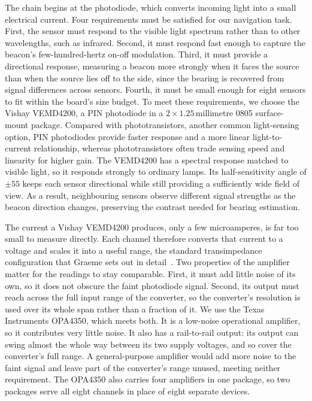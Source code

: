 The chain begins at the photodiode, which converts incoming light into a small electrical current. Four requirements must be satisfied for our navigation task. First, the sensor must respond to the visible light spectrum rather than to other wavelengths, such as infrared. Second, it must respond fast enough to capture the beacon's few-hundred-hertz on-off modulation. Third, it must provide a directional response, measuring a beacon more strongly when it faces the source than when the source lies off to the side, since the bearing is recovered from signal differences across sensors. Fourth, it must be small enough for eight sensors to fit within the board's size budget. To meet these requirements, we choose the Vishay VEMD4200, a PIN photodiode in a $2\times1.25$\,millimetre 0805 surface-mount package. Compared with phototransistors, another common light-sensing option, PIN photodiodes provide faster response and a more linear light-to-current relationship, whereas phototransistors often trade sensing speed and linearity for higher gain. The VEMD4200 has a spectral response matched to visible light, so it responds strongly to ordinary lamps. Its half-sensitivity angle of $\pm 55$\textdegree{} keeps each sensor directional while still providing a sufficiently wide field of view. As a result, neighbouring sensors observe different signal strengths as the beacon direction changes, preserving the contrast needed for bearing estimation.


The current a Vishay VEMD4200 produces, only a few microamperes, is far too small to measure directly. Each channel therefore converts that current to a voltage and scales it into a useful range, the standard transimpedance configuration that Graeme sets out in detail~\cite{graeme1996photodiode}. Two properties of the amplifier matter for the readings to stay comparable. First, it must add little noise of its own, so it does not obscure the faint photodiode signal. Second, its output must reach across the full input range of the converter, so the converter's resolution is used over its whole span rather than a fraction of it. We use the Texas Instruments OPA4350, which meets both. It is a low-noise operational amplifier, so it contributes very little noise. It also has a rail-to-rail output: its output can swing almost the whole way between its two supply voltages, and so cover the converter's full range. A general-purpose amplifier would add more noise to the faint signal and leave part of the converter's range unused, meeting neither requirement. The OPA4350 also carries four amplifiers in one package, so two packages serve all eight channels in place of eight separate devices.

